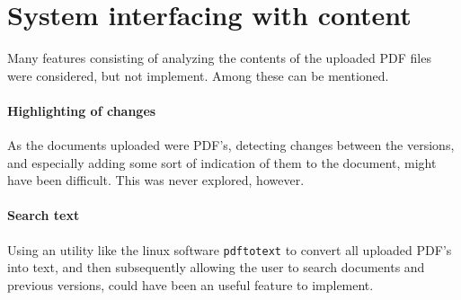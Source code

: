 \documentclass[../../master.tex]{subfiles}
\begin{document}
\section{System interfacing with content}
Many features consisting of analyzing the contents of the uploaded PDF files were considered, but not implement. Among these can be mentioned.

\paragraph{Highlighting of changes}
As the documents uploaded were PDF's, detecting changes between the versions, and especially adding some sort of indication of them to the document, might have been difficult.
This was never explored, however.
\paragraph{Search text}
Using an utility like the linux software \texttt{pdftotext} to convert all uploaded PDF's into text, and then subsequently allowing the user to search documents and previous versions, could have been an useful feature to implement.
\end{document}
